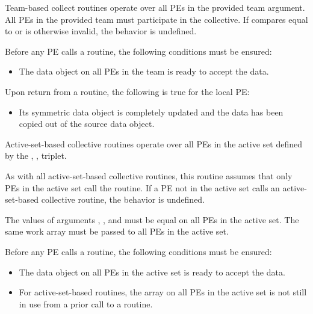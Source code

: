\begin{apidefinition}
{    Team-based collect routines operate over all \acp{PE} in the provided team
    argument. All \acp{PE} in the provided team must participate in the collective.
    If  compares equal to  or is
    otherwise invalid, the behavior is undefined.

    Before any \ac{PE} calls a  routine,
    the following conditions must be ensured:
    \begin{itemize}
    	\item The  data object on all \acp{PE} in the team is
    	ready to accept the  data.
    \end{itemize}

    Upon return from a  routine, the following is true for
    the local PE:
    \begin{itemize}
        \item Its  symmetric data object is completely updated and the 
	data has been copied out of the source data object.
    \end{itemize}

\begin{DeprecateBlock}
    Active-set-based collective routines operate over all \acp{PE} in the active set
    defined by the , ,  triplet.

    As with all active-set-based collective routines,
    this routine assumes that only \acp{PE} in the active set call the routine.
    If a \ac{PE} not in the active set calls an
    active-set-based collective routine,
    the behavior is undefined.

    The values of arguments , ,
    and  must be equal on all \acp{PE} in the active set. The same
     work
    array must be passed to all \acp{PE} in the active set.

    Before any \ac{PE} calls a  routine,
    the following conditions must be ensured:

    \begin{itemize}
    	\item The  data object on all \acp{PE} in the active set is
    	ready to accept the  data.
    	\item For active-set-based routines, the  array
    	on all \acp{PE} in the active set is not still in use from a prior call
    	to a  routine.
    \end{itemize}


\end{DeprecateBlock}}
\end{apidefinition}
